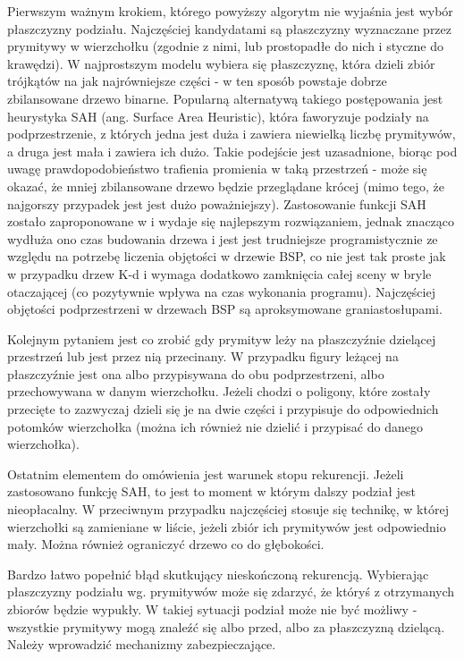 Pierwszym ważnym krokiem, którego powyższy algorytm nie wyjaśnia jest wybór płaszczyzny podziału. Najczęściej kandydatami są płaszczyzny wyznaczane przez prymitywy w wierzchołku (zgodnie z nimi, lub prostopadłe do nich i styczne do krawędzi). W najprostszym modelu wybiera się płaszczyznę, która dzieli zbiór trójkątów na jak najrówniejsze części - w ten sposób powstaje dobrze zbilansowane drzewo binarne. Popularną alternatywą takiego postępowania jest heurystyka SAH \cite{zuk2008, sah1, sah2} (ang. Surface Area Heuristic), która faworyzuje podziały na podprzestrzenie, z których jedna jest duża i zawiera niewielką liczbę prymitywów, a druga jest mała i zawiera ich dużo. Takie podejście jest uzasadnione, biorąc pod uwagę prawdopodobieństwo trafienia promienia w taką przestrzeń - może się okazać, że mniej zbilansowane drzewo będzie przeglądane krócej (mimo tego, że najgorszy przypadek jest jest dużo poważniejszy). Zastosowanie funkcji SAH zostało zaproponowane w \cite{sah1} i wydaje się najlepszym rozwiązaniem, jednak znacząco wydłuża ono czas budowania drzewa i jest jest trudniejsze programistycznie ze względu na potrzebę liczenia objętości w drzewie BSP, co nie jest tak proste jak w przypadku drzew K-d i wymaga dodatkowo zamknięcia całej sceny w bryle otaczającej (co pozytywnie wpływa na czas wykonania programu). Najczęściej objętości podprzestrzeni w drzewach BSP są aproksymowane graniastosłupami.

Kolejnym pytaniem jest co zrobić gdy prymityw leży na płaszczyźnie dzielącej przestrzeń lub jest przez nią przecinany. W przypadku figury leżącej na płaszczyźnie jest ona albo przypisywana do obu podprzestrzeni, albo przechowywana w danym wierzchołku. Jeżeli chodzi o poligony, które zostały przecięte to zazwyczaj dzieli się je na dwie części i przypisuje do odpowiednich potomków wierzchołka (można ich również nie dzielić i przypisać do danego wierzchołka).

Ostatnim elementem do omówienia jest warunek stopu rekurencji. Jeżeli zastosowano funkcję SAH, to jest to moment w którym dalszy podział jest nieopłacalny. W przeciwnym przypadku najczęściej stosuje się technikę, w której wierzchołki są zamieniane w liście, jeżeli zbiór ich prymitywów jest odpowiednio mały. Można również ograniczyć drzewo co do głębokości. 

Bardzo łatwo popełnić błąd skutkujący nieskończoną rekurencją. Wybierając płaszczyzny podziału wg. prymitywów może się zdarzyć, że któryś z otrzymanych zbiorów będzie wypukły. W takiej sytuacji podział może nie być możliwy - wszystkie prymitywy mogą znaleźć się albo przed, albo za płaszczyzną dzielącą. Należy wprowadzić mechanizmy zabezpieczające.


